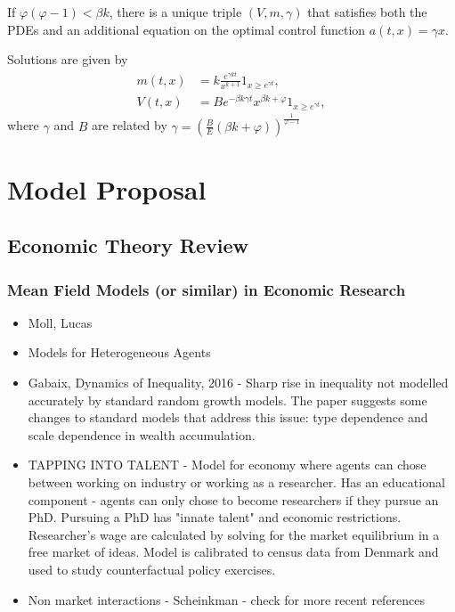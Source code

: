 \documentclass{article}
\begin{document}
\begin{proposition}
    If $\varphi(\varphi - 1) < \beta k$, there is a unique triple $(V,m,\gamma)$ that satisfies both the PDEs and an additional equation on the optimal control function
    $a(t,x) = \gamma x$.

    Solutions are given by
\begin{equation}
    \begin{split}
        m(t,x) &= k \frac{e^{\gamma k t}}{x^{k+1}} 1_{x \geq e^{\gamma t}},\\
        V(t,x) &= B e^{-\beta k \gamma t} x^{\beta k + \varphi} 1_{x \geq e^{\gamma t}},    
    \end{split}
\end{equation}
where $\gamma$ and $B$ are related by $\gamma = \left(\frac{B}{E} (\beta k + \varphi)\right)^{\frac{1}{\varphi - 1}}$
\end{proposition}

\section{Model Proposal}
\subsection{Economic Theory Review}

\subsubsection{ Mean Field Models (or similar) in Economic Research}
\begin{itemize}
    \item Moll, Lucas
    \item Models for Heterogeneous Agents
    \item Gabaix, Dynamics of Inequality, 2016 - Sharp rise in inequality not modelled accurately by standard random growth models. The paper suggests some changes to standard models that address this issue: type dependence and scale dependence in wealth accumulation.
    \item TAPPING INTO TALENT - Model for economy where agents can chose between working on industry or working as a researcher. Has an educational component - agents can only chose to become researchers if they pursue an PhD. Pursuing a PhD has "innate talent" and economic restrictions. Researcher's wage are calculated by solving for the market equilibrium in a free market of ideas. Model is calibrated to census data from Denmark and used to study counterfactual policy exercises.
    \item Non market interactions - Scheinkman - check for more recent references
\end{itemize}
\end{document}
